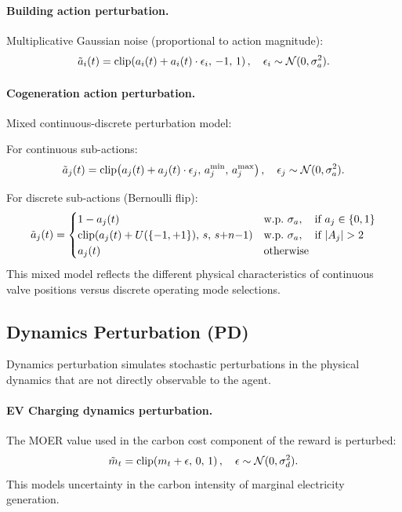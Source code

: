 \paragraph{Building action perturbation.} Multiplicative Gaussian noise (proportional to action magnitude):
\begin{equation}
    \tilde{a}_i(t) = \operatorname{clip}\!\left(a_i(t) + a_i(t) \cdot \epsilon_i, \, -1, \, 1\right), \quad \epsilon_i \sim \mathcal{N}(0, \sigma_a^2).
    \label{eq:bldg_act_noise}
\end{equation}

\paragraph{Cogeneration action perturbation.} Mixed continuous-discrete perturbation model:

For continuous sub-actions:
\begin{equation}
    \tilde{a}_j(t) = \operatorname{clip}\!\left(a_j(t) + a_j(t) \cdot \epsilon_j, \, a_j^{\min}, \, a_j^{\max}\right), \quad \epsilon_j \sim \mathcal{N}(0, \sigma_a^2).
    \label{eq:cogen_act_cont}
\end{equation}

For discrete sub-actions (Bernoulli flip):
\begin{equation}
    \tilde{a}_j(t) = \begin{cases}
    1 - a_j(t) & \text{w.p.\ } \sigma_a, \quad \text{if } a_j \in \{0, 1\} \\
    \clip(a_j(t) + U(\{-1, +1\}), \, s, \, s{+}n{-}1) & \text{w.p.\ } \sigma_a, \quad \text{if } |A_j| > 2 \\
    a_j(t) & \text{otherwise}
    \end{cases}
    \label{eq:cogen_act_disc}
\end{equation}
This mixed model reflects the different physical characteristics of continuous valve positions versus discrete operating mode selections.

\subsection{Dynamics Perturbation (PD)}
\label{sec:env_noise}

Dynamics perturbation simulates stochastic perturbations in the physical dynamics that are not directly observable to the agent.

\paragraph{EV Charging dynamics perturbation.} The MOER value used in the carbon cost component of the reward is perturbed:
\begin{equation}
    \tilde{m}_t = \operatorname{clip}\!\left(m_t + \epsilon, \, 0, \, 1\right), \quad \epsilon \sim \mathcal{N}(0, \sigma_d^2).
    \label{eq:ev_env_noise}
\end{equation}
This models uncertainty in the carbon intensity of marginal electricity generation.


